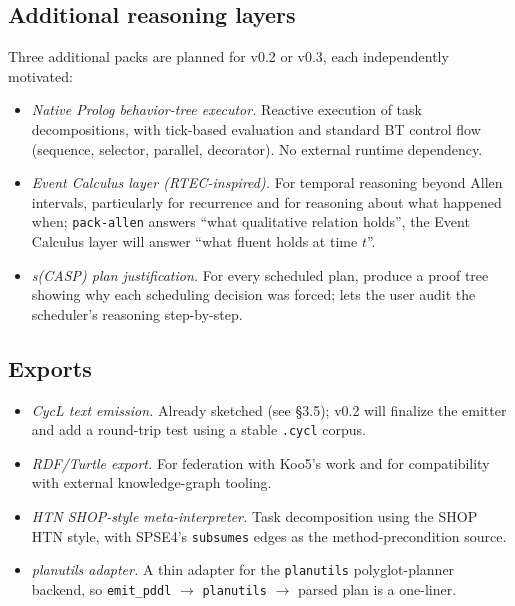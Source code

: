\documentclass[11pt,letterpaper]{article}
\begin{document}
\subsection{Additional reasoning layers}

Three additional packs are planned for v0.2 or v0.3, each independently
motivated:

\begin{itemize}
\item \emph{Native Prolog behavior-tree executor.} Reactive execution of
  task decompositions, with tick-based evaluation and standard BT control
  flow (sequence, selector, parallel, decorator). No external runtime
  dependency.
\item \emph{Event Calculus layer (RTEC-inspired).} For temporal reasoning
  beyond Allen intervals, particularly for recurrence and for reasoning
  about what happened when; \texttt{pack-allen} answers ``what qualitative
  relation holds'', the Event Calculus layer will answer ``what fluent
  holds at time $t$''.
\item \emph{s(CASP) plan justification.} For every scheduled plan, produce
  a proof tree showing why each scheduling decision was forced; lets the
  user audit the scheduler's reasoning step-by-step.
\end{itemize}

\subsection{Exports}

\begin{itemize}
\item \emph{CycL text emission.} Already sketched (see \S3.5); v0.2 will
  finalize the emitter and add a round-trip test using a stable
  \texttt{.cycl} corpus.
\item \emph{RDF/Turtle export.} For federation with Koo5's work and for
  compatibility with external knowledge-graph tooling.
\item \emph{HTN SHOP-style meta-interpreter.} Task decomposition using the
  SHOP HTN style, with SPSE4's \texttt{subsumes} edges as the
  method-precondition source.
\item \emph{planutils adapter.} A thin adapter for the \texttt{planutils}
  polyglot-planner backend, so \texttt{emit\_pddl} $\to$ \texttt{planutils}
  $\to$ parsed plan is a one-liner.
\end{itemize}

\end{document}
